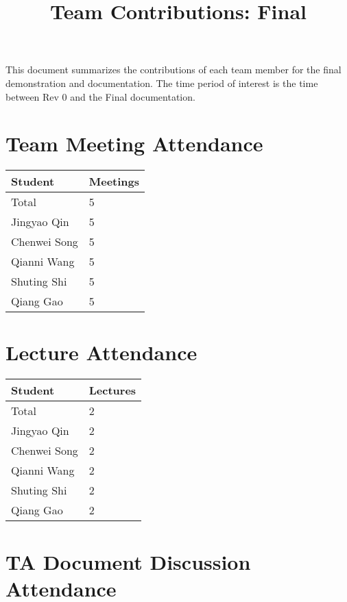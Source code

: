 \documentclass{article}
\title{Team Contributions: Final\\\progname}
\author{\authname}
\date{}
\begin{document}
\maketitle

This document summarizes the contributions of each team member for the final
demonstration and documentation.  The time period of interest is the time
between Rev 0 and the Final documentation.

\section{Team Meeting Attendance}


\begin{table}[H]
\centering
\begin{tabular}{ll}
\toprule
\textbf{Student} & \textbf{Meetings}\\
\midrule
Total & 5\\
Jingyao Qin  & 5\\
Chenwei Song  & 5\\
Qianni Wang  & 5\\
Shuting Shi  & 5\\
Qiang Gao  & 5\\
\bottomrule
\end{tabular}
\end{table}

\section{Lecture Attendance}



\begin{table}[H]
\centering
\begin{tabular}{ll}
\toprule
\textbf{Student} & \textbf{Lectures}\\
\midrule
Total & 2\\
Jingyao Qin  & 2\\
Chenwei Song  & 2\\
Qianni Wang  & 2\\
Shuting Shi  & 2\\
Qiang Gao  & 2\\
\bottomrule
\end{tabular}
\end{table}


\section{TA Document Discussion Attendance}
\end{document}
